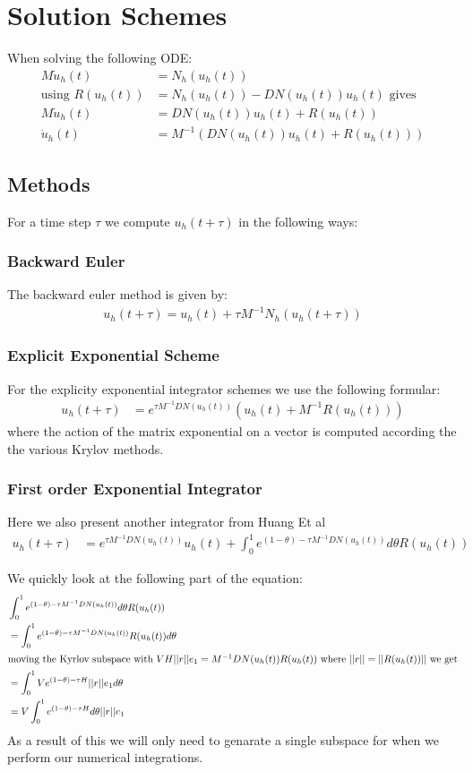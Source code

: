 \section{Solution Schemes}

When solving the following ODE:
\begin{align*}
M\dot u_h(t) &= N_h(u_h(t))\\ %
\text{using } R(u_h(t)) &= N_h(u_h(t)) - DN(u_h(t))u_h(t) \text{ gives}\\
M\dot u_h(t) &= DN(u_h(t))u_h(t) + R(u_h(t))\\
\dot u_h(t) &= M^{-1}(DN(u_h(t))u_h(t) + R(u_h(t)))
\end{align*}
\subsection{Methods}
For a time step $\tau$ we compute $u_h(t+\tau)$ in the following ways: 
\subsubsection{Backward Euler}
The backward euler method is given by:
\begin{align*}
u_h(t+\tau) = u_h(t) + \tau M^{-1}N_h(u_h(t+\tau))
\end{align*}
\subsubsection{Explicit Exponential Scheme} %
For the explicity exponential integrator schemes we use the following formular:
\begin{align*}
u_h(t+\tau) &= e^{\tau M^{-1} DN(u_h(t))}(u_h(t) + M^{-1}R(u_h(t)))
\end{align*}
where the action of the matrix exponential on a vector is computed according the the various Krylov methods.

\subsubsection{First order Exponential Integrator}
Here we also present another integrator from Huang Et al \cite{Huang2022}
\begin{align*}
u_h(t+\tau) &= e^{\tau M^{-1} DN(u_h(t))}u_h(t) + \int^1_0e^{(1-\theta) -\tau M^{-1}DN(u_h(t))}d\theta R(u_h(t))
\end{align*}

We quickly look at the following part of the equation:
\begin{align*}
    &  \int^1_0e^{(1-\theta) -\tau M^{-1}DN(u_h(t))}d\theta R(u_h(t))\\
    &= \int^1_0e^{(1-\theta) -\tau M^{-1}DN(u_h(t))}R(u_h(t))d\theta\\
\intertext{moving the Kyrlov subspace with $VH||r||e_1 = M^{-1}DN(u_h(t))R(u_h(t))$ where $||r|| = ||R(u_h(t))||$ we get}
    &= \int^1_0Ve^{(1-\theta) -\tau H}||r||e_1d\theta\\
    &= V\int^1_0e^{(1-\theta) -\tau H}d\theta||r||e_1
\end{align*}
As a result of this we will only need to genarate a single subspace for when we perform our numerical integrations.
